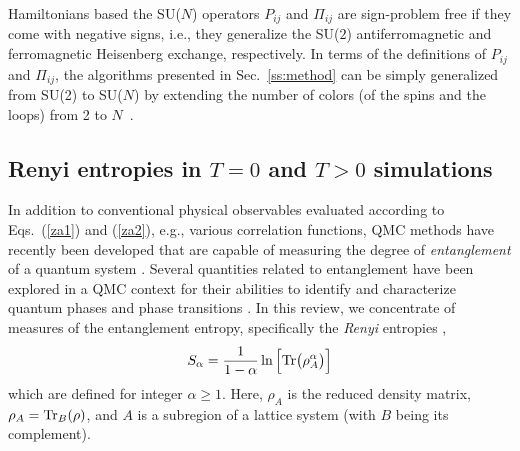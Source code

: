 \documentclass[range]{ar2e}
\begin{document}
{\color{red} Hamiltonians based the SU($N$) operators $P_{ij}$ and $\Pi_{ij}$ are sign-problem free if they come with negative signs, i.e.,
they generalize the SU($2$) antiferromagnetic and ferromagnetic Heisenberg exchange, respectively}. In terms of the definitions of $P_{ij}$ and 
$\Pi_{ij}$, the algorithms presented in Sec.~\ref{ss:method} can be simply generalized from SU(2) to SU($N$) by extending the number of colors 
(of the spins and the loops) from 2 to $N$~\cite{harada2003:sun,beach2009:sun,kaul2011:j1j2}.

\subsection{Renyi entropies in $T=0$ and $T>0$ simulations} 
\label{ss:renyi}

In addition to conventional physical observables evaluated according to Eqs.~(\ref{za1}) and (\ref{za2}), e.g., various correlation functions, 
QMC methods have recently been developed that are capable of measuring the degree of {\it entanglement} of a quantum system \cite{EntangleMeasure}. Several 
quantities related to entanglement have been explored in a QMC context for their abilities to identify and characterize quantum phases and phase 
transitions \cite{Tommaso1,Tommaso2,fluc1,fluc2,fid1,fid2}.  In this review, we concentrate of measures of the entanglement entropy, specifically 
the {\it Renyi} entropies \cite{renyi},
\begin{equation}
S_{\alpha} = \frac{1}{1-\alpha} \ln \Big[ {\rm Tr}\big( \rho_A^{\alpha} \big) \Big]
\end{equation}
which are defined for integer $\alpha \ge 1$.  Here, $\rho_A$ is the reduced density matrix, $\rho_A = {\rm Tr}_B (\rho)$, and $A$ is a subregion of 
a lattice system (with $B$ being its complement).  
 
\end{document}
